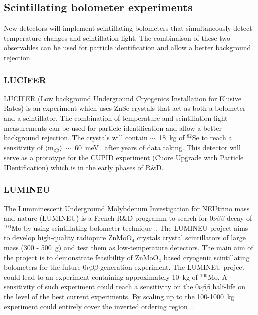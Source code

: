 \documentclass[main.tex]{subfiles}
\begin{document}
\subsection{Scintillating bolometer experiments}


New detectors will implement scintillating bolometers that simultaneously detect temperature changes and scintillation light. The combinaison of these two observables can be used for particle identification and allow a better background rejection.  


\subsubsection{LUCIFER}


\NI LUCIFER (Low background Underground Cryogenics Installation for Elusive Rates) is an experiment which uses ZnSe crystals that act as both a bolometer and a scintillator. The combination of temperature and scintillation light measurements can be used for particle identification and allow a better background rejection. The crystals will contain $\sim$~18~kg of $^{\text{82}}$Se to reach a sensitivity of $\langle \text{m}_{\beta\beta} \rangle$~$\sim$~60~meV~\cite{LUCIFER} after years of data taking. This detector will serve as a prototype for the CUPID experiment (Cuore Upgrade with Particle IDentification) which is in the early phases of R\&D.


\subsubsection{LUMINEU}


\NI The Lumminescent Underground Molybdenum Investigation for NEUtrino mass and nature (LUMINEU) is a French R\&D programm to search for 0$\nu\beta\beta$ decay of $^{\text{100}}$Mo by using scintillating bolometer technique~\cite{LUMINEU}. The LUMINEU project aims to develop high-quality radiopure ZnMoO$_\text{4}$ crystals crystal scintillators of large mass (300 - 500~g) and test them as low-temperature detectors. The main aim of the project is to demonstrate feasibility of ZnMoO$_\text{4}$ based  cryogenic scintillating  bolometers for the future 0$\nu\beta\beta$ generation experiment. The LUMINEU project could lead to an experiment containing approximately 10~kg of $^{\text{100}}$Mo. A sensitivity of such experiment could reach a sensitivity on the 0$\nu\beta\beta$ half-life on the level of the best current experiments. By scaling up to the 100-1000~kg experiment could entirely cover the inverted ordering region~\cite{LUMINEU}.
\end{document}
